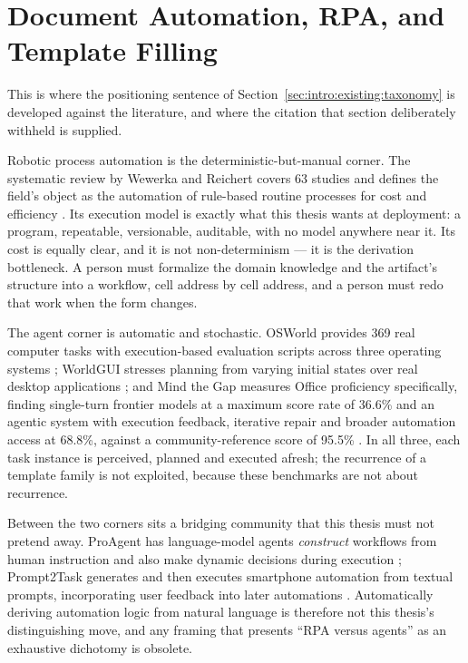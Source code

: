 \section{Document Automation, RPA, and Template Filling}
\label{sec:rel:rpa}

This is where the positioning sentence of Section~\ref{sec:intro:existing:taxonomy} is
developed against the literature, and where the citation that section deliberately withheld is
supplied.

Robotic process automation is the deterministic-but-manual corner. The systematic review by
Wewerka and Reichert covers 63 studies and defines the field's object as the automation of
rule-based routine processes for cost and efficiency \cite{wewerka2020rpa}. Its execution model
is exactly what this thesis wants at deployment: a program, repeatable, versionable,
auditable, with no model anywhere near it. Its cost is equally clear, and it is not
non-determinism --- it is the derivation bottleneck. A person must formalize the domain
knowledge and the artifact's structure into a workflow, cell address by cell address, and a
person must redo that work when the form changes.

The agent corner is automatic and stochastic. OSWorld provides 369 real computer tasks with
execution-based evaluation scripts across three operating systems \cite{xie2024osworld};
WorldGUI stresses planning from varying initial states over real desktop applications
\cite{zhao2025worldgui}; and Mind the Gap measures Office proficiency specifically, finding
single-turn frontier models at a maximum score rate of 36.6\% and an agentic system with
execution feedback, iterative repair and broader automation access at 68.8\%, against a
community-reference score of 95.5\% \cite{lv2026mindthegap}. In all three, each task instance is
perceived, planned and executed afresh; the recurrence of a template family is not exploited,
because these benchmarks are not about recurrence.

Between the two corners sits a bridging community that this thesis must not pretend away.
ProAgent has language-model agents \emph{construct} workflows from human instruction and also
make dynamic decisions during execution \cite{ye2023proagent}; Prompt2Task generates and then
executes smartphone automation from textual prompts, incorporating user feedback into later
automations \cite{huang2025prompt2task}. Automatically deriving automation logic from natural
language is therefore not this thesis's distinguishing move, and any framing that presents
``RPA versus agents'' as an exhaustive dichotomy is obsolete.

